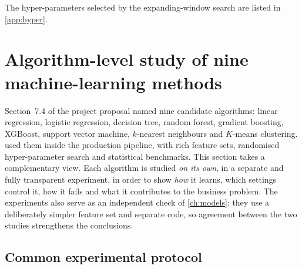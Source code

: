 The hyper-parameters selected by the expanding-window search are listed in \cref{app:hyper}.

\section{Algorithm-level study of nine machine-learning methods}\label{ch:algorithms}

Section~7.4 of the project proposal named nine candidate algorithms: linear regression, logistic regression,
decision tree, random forest, gradient boosting, XGBoost, support vector machine, $k$-nearest neighbours and
$K$-means clustering.  used them inside the production pipeline, with rich feature sets,
randomised hyper-parameter search and statistical benchmarks. This section takes a complementary view. Each
algorithm is studied \emph{on its own}, in a separate and fully transparent experiment, in order to show
\emph{how} it learns, which settings control it, how it fails and what it contributes to the business problem.
The experiments also serve as an independent check of \cref{ch:models}: they use a deliberately simpler feature
set and separate code, so agreement between the two studies strengthens the conclusions.

\subsection{Common experimental protocol}\label{sec:algoprotocol}
